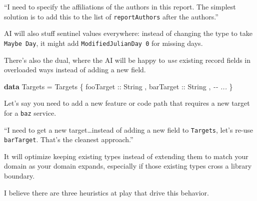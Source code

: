 \documentclass[]{article}
\newenvironment{Shaded}{}{}
\newcommand{\CommentTok}[1]{\textcolor[rgb]{0.38,0.63,0.69}{\textit{#1}}}
\newcommand{\DataTypeTok}[1]{\textcolor[rgb]{0.56,0.13,0.00}{#1}}
\newcommand{\KeywordTok}[1]{\textcolor[rgb]{0.00,0.44,0.13}{\textbf{#1}}}
\newcommand{\NormalTok}[1]{#1}
\newcommand{\OtherTok}[1]{\textcolor[rgb]{0.00,0.44,0.13}{#1}}
\begin{document}
{``I need to specify the affiliations of the authors in this report. The
simplest solution is to add this to the list of \texttt{reportAuthors} after the
authors.''}

AI will also stuff sentinel values everywhere: instead of changing the type to
take \texttt{Maybe\ Day}, it might add \texttt{ModifiedJulianDay\ 0} for missing
days.

There's also the dual, where the AI will be happy to \emph{use} existing record
fields in overloaded ways instead of adding a new field.

\begin{Shaded}
\begin{Highlighting}[]
\KeywordTok{data} \DataTypeTok{Targets} \OtherTok{=} \DataTypeTok{Targets}
\NormalTok{    \{}\OtherTok{ fooTarget ::} \DataTypeTok{String}
\NormalTok{    ,}\OtherTok{ barTarget ::} \DataTypeTok{String}
\NormalTok{    , }\CommentTok{{-}{-} ...}
\NormalTok{    \}}
\end{Highlighting}
\end{Shaded}

Let's say you need to add a new feature or code path that requires a new target
for a \texttt{baz} service.

{``I need to get a new target\ldots instead of adding a new field to
\texttt{Targets}, let's re-use \texttt{barTarget}. That's the cleanest
approach.''}

It will optimize keeping existing types instead of extending them to match your
domain as your domain expands, especially if those existing types cross a
library boundary.

I believe there are three heuristics at play that drive this behavior.
\end{document}
